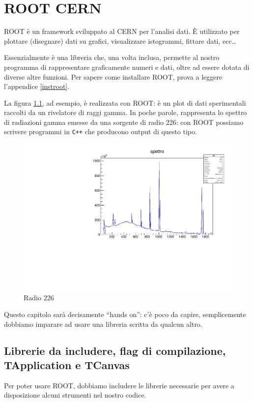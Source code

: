 \def\scaledim{0.44} 
\chapter{ROOT CERN}
ROOT è un framework sviluppato al CERN per l'analisi dati. È utilizzato per plottare (disegnare) dati su grafici, visualizzare istogrammi, fittare dati, ecc\ldots

Essenzialmente è una libreria che, una volta inclusa, permette al nostro programma di rappresentare graficamente numeri e dati, oltre ad essere dotata di diverse altre funzioni. Per sapere come installare ROOT, prova a leggere l'appendice \ref{instroot}.

La figura \ref{root1}, ad esempio, è realizzata con ROOT: è un plot di dati sperimentali raccolti da un rivelatore di raggi gamma. In poche parole, rappresenta lo spettro di radiazioni gamma emesse da una sorgente di radio 226: con ROOT possiamo scrivere programmi in \verb|C++| che producono output di questo tipo.
\begin{figure} [ht]
	\centering
	\includegraphics[scale=\scaledim]{Immagini/root1.pdf}  
	\caption{Radio 226}
	\label{root1}
\end{figure}


Questo capitolo sarà decisamente ``hands on'': c'è poco da capire, semplicemente dobbiamo imparare ad usare una libreria scritta da qualcun altro.
\section{Librerie da includere, flag di compilazione, TApplication e TCanvas}
Per poter usare ROOT, dobbiamo includere le librerie necessarie per avere a disposizione alcuni strumenti nel nostro codice. 

